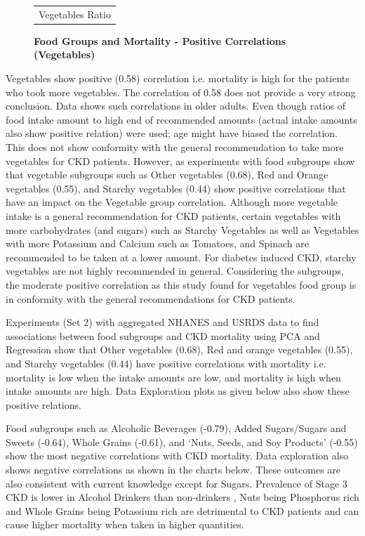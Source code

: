 \begin{figure}
\begin{tabular}{cc}
	\multicolumn{2}{c}{Vegetables Ratio}  \\ 
\end{tabular}
\centering
\caption{\textbf{Food Groups and Mortality - Positive Correlations (Vegetables) }}
\end{figure}

\noindent Vegetables show positive (0.58) correlation i.e. mortality is high for the patients who took more vegetables. The correlation of 0.58 does not provide a very strong conclusion. Data shows such correlations in older adults. Even though ratios of food intake amount to high end of recommended amounts (actual intake amounts also show positive relation) were used; age might have biased the correlation. This does not show conformity with the general recommendation to take more vegetables for CKD patients. However, as experiments with food subgroups show that vegetable subgroups such as Other vegetables (0.68), Red and Orange vegetables (0.55), and Starchy vegetables (0.44) show positive correlations that have an impact on the Vegetable group correlation.  Although more vegetable intake is a general recommendation for CKD patients, certain vegetables with more carbohydrates (and sugars) such as Starchy Vegetables as well as Vegetables with more Potassium and Calcium such as Tomatoes, and Spinach are recommended to be taken at a lower amount. For diabetes induced CKD, starchy vegetables are not highly recommended in general. Considering the subgroups, the moderate positive correlation as this study found for vegetables food group is in conformity with the general recommendations for CKD patients.

\noindent Experiments (Set 2) with aggregated NHANES and USRDS data to find associations between food subgroups and CKD mortality using PCA and Regression show that  Other vegetables (0.68),    Red and orange vegetables (0.55), and Starchy vegetables (0.44)  have positive correlations with mortality i.e. mortality is low when the intake amounts are low, and mortality is high when intake amounts are high. Data Exploration plots as given below also show these positive relations.

\noindent  Food subgroups such as Alcoholic Beverages (-0.79),    Added Sugars/Sugars and Sweets (-0.64), Whole Grains (-0.61), and  `Nuts, Seeds, and Soy Products' (-0.55) show the most negative correlations with CKD mortality. Data exploration also shows negative correlations as shown in the charts below. These outcomes are also consistent with current knowledge except for Sugars. Prevalence of Stage 3 CKD is lower in Alcohol Drinkers than non-drinkers \cite{Jaimonetal2017} \cite{Hsuetal2013}, Nuts being Phosphorus rich and Whole Grains being Potassium rich are detrimental to CKD patients and can cause higher mortality when taken in higher quantities.

